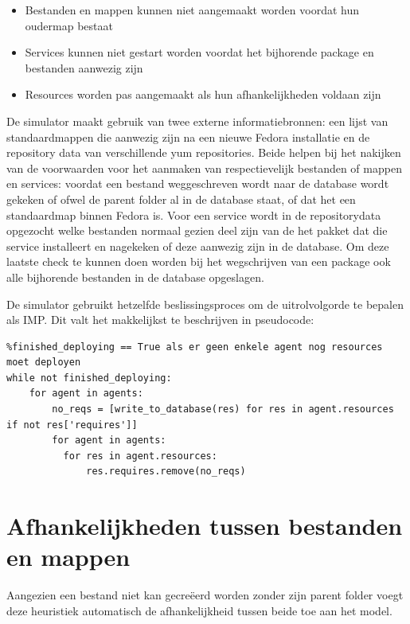 \begin{itemize}
  \item Bestanden en mappen kunnen niet aangemaakt worden voordat hun oudermap bestaat
  \item Services kunnen niet gestart worden voordat het bijhorende package en bestanden aanwezig zijn
  \item Resources worden pas aangemaakt als hun afhankelijkheden voldaan zijn
\end{itemize}

De simulator maakt gebruik van twee externe informatiebronnen: een lijst van standaardmappen die aanwezig zijn na een nieuwe Fedora installatie en de repository data van verschillende yum repositories.
Beide helpen bij het nakijken van de voorwaarden voor het aanmaken van respectievelijk bestanden of mappen en services:
voordat een bestand weggeschreven wordt naar de database wordt gekeken of ofwel de parent folder al in de database staat, of dat het een standaardmap binnen Fedora is.
Voor een service wordt in de repositorydata opgezocht welke bestanden normaal gezien deel zijn van de het pakket dat die service installeert en nagekeken of deze aanwezig zijn in de database.
Om deze laatste check te kunnen doen worden bij het wegschrijven van een package ook alle bijhorende bestanden in de database opgeslagen.

De simulator gebruikt hetzelfde beslissingsproces om de uitrolvolgorde te bepalen als IMP.
Dit valt het makkelijkst te beschrijven in pseudocode:

\begin{lstlisting}
%finished_deploying == True als er geen enkele agent nog resources moet deployen
while not finished_deploying:
    for agent in agents:
        no_reqs = [write_to_database(res) for res in agent.resources if not res['requires']]
        for agent in agents:
          for res in agent.resources:
              res.requires.remove(no_reqs)
\end{lstlisting}


\section{Afhankelijkheden tussen bestanden en mappen}
\label{sec:bestanden_en_mappen_eval}
Aangezien een bestand niet kan gecre\"eerd worden zonder zijn parent folder voegt deze heuristiek automatisch de afhankelijkheid tussen beide toe aan het model.

